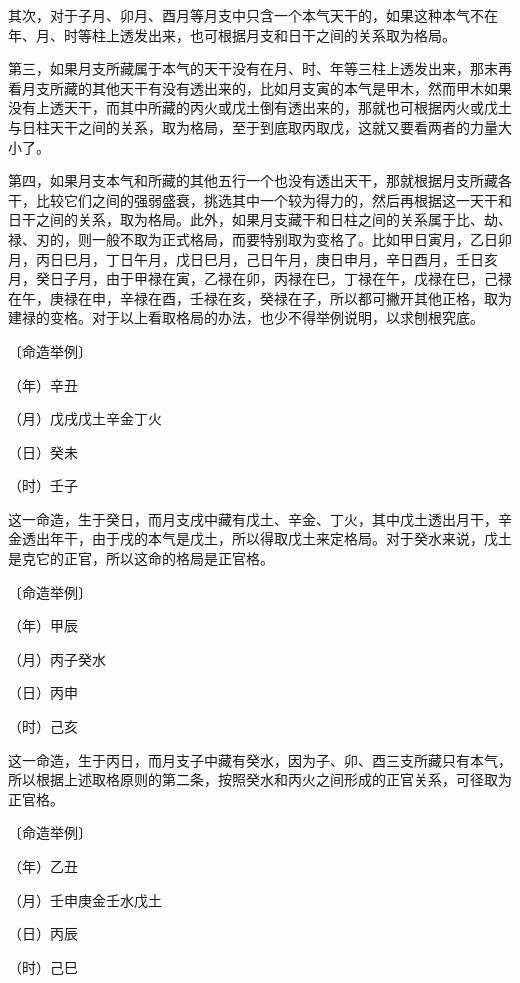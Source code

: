 \documentclass[a5paper,oneside,12pt]{ctexbook}
\begin{document}
其次，对于子月、卯月、酉月等月支中只含一个本气天干的，如果这种本气不在年、月、时等柱上透发出来，也可根据月支和日干之间的关系取为格局。

第三，如果月支所藏属于本气的天干没有在月、时、年等三柱上透发出来，那末再看月支所藏的其他天干有没有透出来的，比如月支寅的本气是甲木，然而甲木如果没有上透天干，而其中所藏的丙火或戊土倒有透出来的，那就也可根据丙火或戊土与日柱天干之间的关系，取为格局，至于到底取丙取戊，这就又要看两者的力量大小了。

第四，如果月支本气和所藏的其他五行一个也没有透出天干，那就根据月支所藏各干，比较它们之间的强弱盛衰，挑选其中一个较为得力的，然后再根据这一天干和日干之间的关系，取为格局。此外，如果月支藏干和日柱之间的关系属于比、劫、禄、刃的，则一般不取为正式格局，而要特别取为变格了。比如甲日寅月，乙日卯月，丙日巳月，丁日午月，戊日巳月，己日午月，庚日申月，辛日酉月，壬日亥月，癸日子月，由于甲禄在寅，乙禄在卯，丙禄在巳，丁禄在午，戊禄在巳，己禄在午，庚禄在申，辛禄在酉，壬禄在亥，癸禄在子，所以都可撇开其他正格，取为建禄的变格。对于以上看取格局的办法，也少不得举例说明，以求刨根究底。

〔命造举例〕\par
（年）\quad{\scriptsize{\qquad{}}}辛丑\par
（月）戊戌{\scriptsize{戊土\quad{}辛金\quad{}丁火}}\par
（日）\quad{\scriptsize{\qquad{}}}癸未\par
（时）\quad{\scriptsize{\qquad{}}}壬子

这一命造，生于癸日，而月支戌中藏有戊土、辛金、丁火，其中戊土透出月干，辛金透出年干，由于戌的本气是戊土，所以得取戊土来定格局。对于癸水来说，戊土是克它的正官，所以这命的格局是正官格。

〔命造举例〕\par
（年）\quad{}甲辰\par
（月）\quad{}丙子{\scriptsize{癸水}}\par
（日）\quad{}丙申\par
（时）\quad{}己亥

这一命造，生于丙日，而月支子中藏有癸水，因为子、卯、酉三支所藏只有本气，所以根据上述取格原则的第二条，按照癸水和丙火之间形成的正官关系，可径取为正官格。

〔命造举例〕\par
（年）\quad{}乙丑\par
（月）\quad{}壬申{\scriptsize{庚金\quad{}壬水\quad{}戊土}}\par
（日）\quad{}丙辰\par
（时）\quad{}己巳\par
\end{document}
